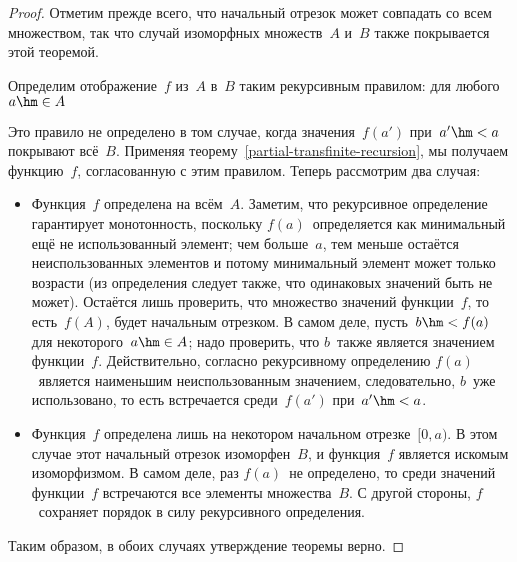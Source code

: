 \begin{proof}
Отметим прежде всего, что начальный отрезок может совпадать со
всем множеством, так что случай изоморфных множеств~$A$ и~$B$
также покрывается этой теоремой.

Определим отображение~$f$ из~$A$ в~$B$ таким рекурсивным
правилом: для любого~$a\hm\in A$

Это правило не определено в том случае, когда значения~$f(a')$
при~$a'\hm<a$ покрывают всё~$B$. Применяя
теорему~\ref{partial-transfinite-recursion}, мы получаем функцию~$f$,
согласованную с этим правилом. Теперь рассмотрим два случая:

\begin{itemize}
\item
Функция~$f$ определена на всём~$A$.
Заметим, что рекурсивное определение гарантирует монотонность,
поскольку $f(a)$~определяется как минимальный ещё не использованный
элемент; чем больше~$a$, тем меньше остаётся
неиспользованных элементов
и по\-то\-му минимальный элемент
может только возрасти (из определения следует
также, что одинаковых значений быть не может).
Остаётся лишь проверить, что множество значений функции~$f$, то
есть~$f(A)$, будет начальным отрезком. В самом деле, пусть~$b\hm<f(a)$
для некоторого~$a\hm\in A$; надо проверить, что $b$~также
является значением функции~$f$. Действительно, согласно
рекурсивному определению $f(a)$~является наименьшим неиспользованным
значением, следовательно, $b$~уже использовано, то есть встречается
среди~$f(a')$ при~$a'\hm<a$.
\item
Функция~$f$ определена лишь на некотором
начальном отрезке~$[0,a)$. В этом случае этот начальный отрезок
изоморфен~$B$, и функция~$f$ является искомым изоморфизмом.
В самом деле, раз $f(a)$~не определено, то среди значений
функции~$f$ встречаются все элементы множества~$B$.
С другой стороны, $f$~сохраняет порядок в силу рекурсивного
определения.
\end{itemize}
Таким образом, в обоих случаях утверждение
теоремы верно.
\end{proof}

